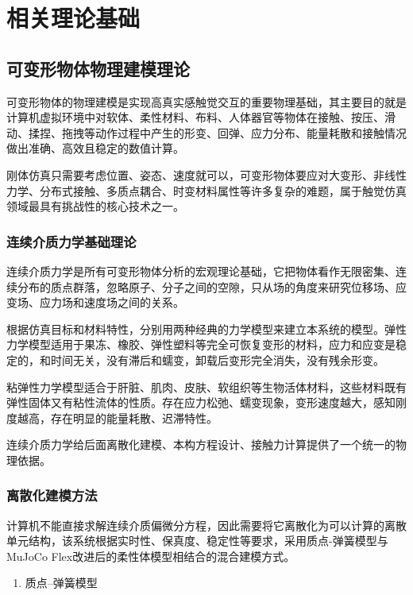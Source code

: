
\chapter{相关理论基础}

\section{可变形物体物理建模理论}

可变形物体的物理建模是实现高真实感触觉交互的重要物理基础，其主要目的就是计算机虚拟环境中对软体、柔性材料、布料、人体器官等物体在接触、按压、滑动、揉捏、拖拽等动作过程中产生的形变、回弹、应力分布、能量耗散和接触情况做出准确、高效且稳定的数值计算。

刚体仿真只需要考虑位置、姿态、速度就可以，可变形物体要应对大变形、非线性力学、分布式接触、多质点耦合、时变材料属性等许多复杂的难题，属于触觉仿真领域最具有挑战性的核心技术之一。

\subsection{连续介质力学基础理论}

连续介质力学是所有可变形物体分析的宏观理论基础，它把物体看作无限密集、连续分布的质点群落，忽略原子、分子之间的空隙，只从场的角度来研究位移场、应变场、应力场和速度场之间的关系\cite{ref27}。

根据仿真目标和材料特性，分别用两种经典的力学模型来建立本系统的模型。弹性力学模型适用于果冻、橡胶、弹性塑料等完全可恢复变形的材料，应力和应变是稳定的，和时间无关，没有滞后和蠕变，卸载后变形完全消失，没有残余形变。

粘弹性力学模型适合于肝脏、肌肉、皮肤、软组织等生物活体材料，这些材料既有弹性固体又有粘性流体的性质。存在应力松弛、蠕变现象，变形速度越大，感知刚度越高，存在明显的能量耗散、迟滞特性。

连续介质力学给后面离散化建模、本构方程设计、接触力计算提供了一个统一的物理依据。

\subsection{离散化建模方法}

计算机不能直接求解连续介质偏微分方程，因此需要将它离散化为可以计算的离散单元结构，该系统根据实时性、保真度、稳定性等要求，采用质点-弹簧模型与MuJoCo
Flex改进后的柔性体模型相结合的混合建模方式。

\begin{enumerate}
\def\labelenumi{\arabic{enumi}.}
\item
  质点--弹簧模型
\end{enumerate}

